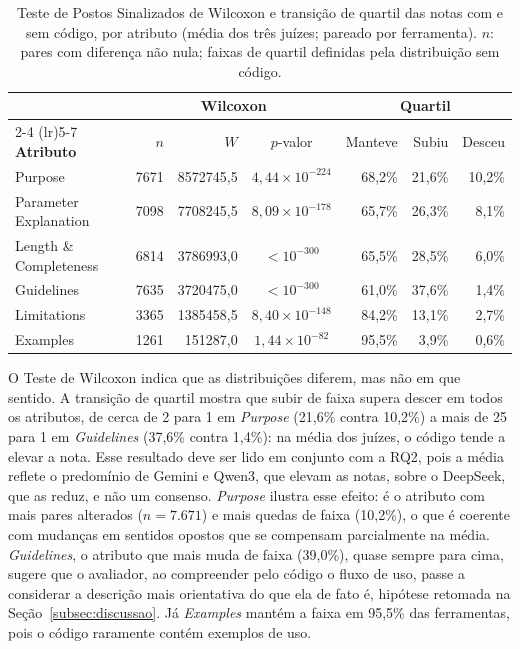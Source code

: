 \begin{table}[htbp]
\centering
\caption{Teste de Postos Sinalizados de Wilcoxon e transição de quartil das notas com e sem código, por atributo (média dos três juízes; pareado por ferramenta). $n$: pares com diferença não nula; faixas de quartil definidas pela distribuição sem código.}
\label{tab:wilcoxon_media}
\footnotesize
\setlength{\tabcolsep}{4pt}
\begin{tabular}{lrrcrrr}
\toprule
 & \multicolumn{3}{c}{\textbf{Wilcoxon}} & \multicolumn{3}{c}{\textbf{Quartil}} \\
\cmidrule(lr){2-4} \cmidrule(lr){5-7}
\textbf{Atributo} & $n$ & $W$ & $p$-valor & Manteve & Subiu & Desceu \\
\midrule
Purpose & 7671 & 8572745,5 & $4{,}44 \times 10^{-224}$ & 68,2\% & 21,6\% & 10,2\% \\
Parameter Explanation & 7098 & 7708245,5 & $8{,}09 \times 10^{-178}$ & 65,7\% & 26,3\% & 8,1\% \\
Length \& Completeness & 6814 & 3786993,0 & $< 10^{-300}$ & 65,5\% & 28,5\% & 6,0\% \\
Guidelines & 7635 & 3720475,0 & $< 10^{-300}$ & 61,0\% & 37,6\% & 1,4\% \\
Limitations & 3365 & 1385458,5 & $8{,}40 \times 10^{-148}$ & 84,2\% & 13,1\% & 2,7\% \\
Examples & 1261 & 151287,0 & $1{,}44 \times 10^{-82}$ & 95,5\% & 3,9\% & 0,6\% \\
\bottomrule
\end{tabular}
\end{table}



O Teste de Wilcoxon indica que as distribuições diferem, mas não em que sentido. A transição de quartil mostra que subir de faixa supera descer em todos os atributos, de cerca de 2 para 1 em \textit{Purpose} (21,6\% contra 10,2\%) a mais de 25 para 1 em \textit{Guidelines} (37,6\% contra 1,4\%): na média dos juízes, o código tende a elevar a nota. Esse resultado deve ser lido em conjunto com a RQ2, pois a média reflete o predomínio de Gemini e Qwen3, que elevam as notas, sobre o DeepSeek, que as reduz, e não um consenso. \textit{Purpose} ilustra esse efeito: é o atributo com mais pares alterados ($n = 7.671$) e mais quedas de faixa (10,2\%), o que é coerente com mudanças em sentidos opostos que se compensam parcialmente na média. \textit{Guidelines}, o atributo que mais muda de faixa (39,0\%), quase sempre para cima, sugere que o avaliador, ao compreender pelo código o fluxo de uso, passe a considerar a descrição mais orientativa do que ela de fato é, hipótese retomada na Seção~\ref{subsec:discussao}. Já \textit{Examples} mantém a faixa em 95,5\% das ferramentas, pois o código raramente contém exemplos de uso.

